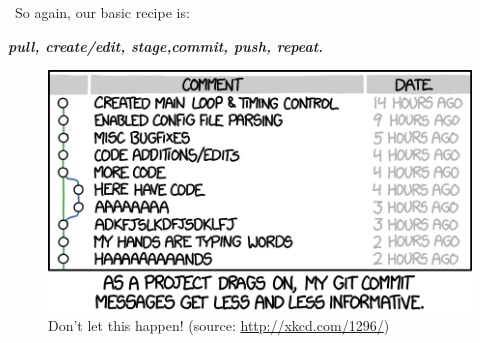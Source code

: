\documentclass[12pt,letterpaper]{article}
\begin{document}
\
So again, our basic recipe is:
\begin{center}
	\textbf{\emph{pull, create/edit, stage,commit, push, repeat.}}
\end{center}

\begin{figure}[!h]
	\centering
	\includegraphics[width=0.7\linewidth]{figs/xkcd_git_commit}
	\caption{Don't let this happen!  (source: \url{http://xkcd.com/1296/})}
	\label{fig:commit_messages}
\end{figure}

\clearpage


\end{document}
